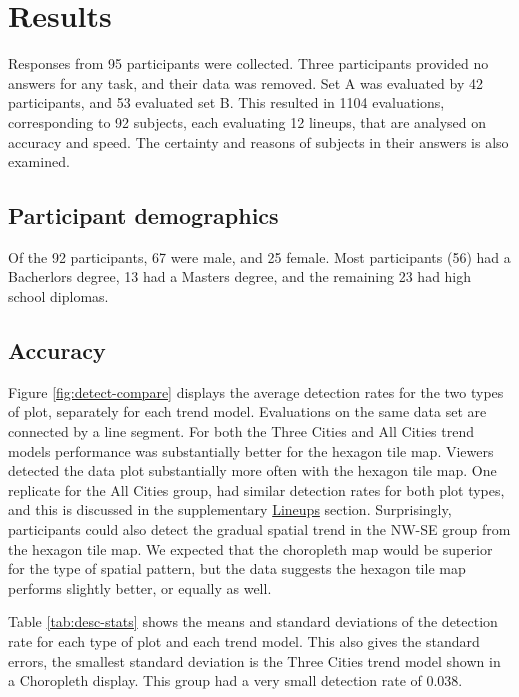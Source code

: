 \documentclass[conference,final,]{IEEEtran}
\begin{document}
\hypertarget{results}{%
\section{Results}\label{results}}

Responses from 95 participants were collected. Three participants provided no answers for any task, and their data was removed. Set A was evaluated by 42 participants, and 53 evaluated set B. This resulted in 1104 evaluations, corresponding to 92 subjects, each evaluating 12 lineups, that are analysed on accuracy and speed. The certainty and reasons of subjects in their answers is also examined.

\hypertarget{participant-demographics}{%
\subsection{Participant demographics}\label{participant-demographics}}

Of the 92 participants, 67 were male, and 25 female. Most participants (56) had a Bacherlors degree, 13 had a Masters degree, and the remaining 23 had high school diplomas.

\hypertarget{accuracy}{%
\subsection{Accuracy}\label{accuracy}}

Figure \ref{fig:detect-compare} displays the average detection rates for the two types of plot, separately for each trend model. Evaluations on the same data set are connected by a line segment. For both the Three Cities and All Cities trend models performance was substantially better for the hexagon tile map. Viewers detected the data plot substantially more often with the hexagon tile map. One replicate for the All Cities group, had similar detection rates for both plot types, and this is discussed in the supplementary \protect\hyperlink{lineups}{Lineups} section. Surprisingly, participants could also detect the gradual spatial trend in the NW-SE group from the hexagon tile map. We expected that the choropleth map would be superior for the type of spatial pattern, but the data suggests the hexagon tile map performs slightly better, or equally as well.

Table \ref{tab:desc-stats} shows the means and standard deviations of the detection rate for each type of plot and each trend model. This also gives the standard errors, the smallest standard deviation is the Three Cities trend model shown in a Choropleth display. This group had a very small detection rate of 0.038.
\end{document}
